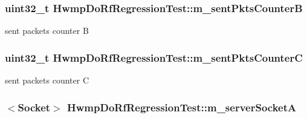 \subsubsection[{\texorpdfstring{m\+\_\+sent\+Pkts\+CounterB}{m_sentPktsCounterB}}]{\setlength{\rightskip}{0pt plus 5cm}uint32\+\_\+t Hwmp\+Do\+Rf\+Regression\+Test\+::m\+\_\+sent\+Pkts\+CounterB\hspace{0.3cm}{\ttfamily [private]}}\hypertarget{classHwmpDoRfRegressionTest_ade43bb8fd9548c572bac08b86fb842c7}{}\label{classHwmpDoRfRegressionTest_ade43bb8fd9548c572bac08b86fb842c7}


sent packets counter B 

\subsubsection[{\texorpdfstring{m\+\_\+sent\+Pkts\+CounterC}{m_sentPktsCounterC}}]{\setlength{\rightskip}{0pt plus 5cm}uint32\+\_\+t Hwmp\+Do\+Rf\+Regression\+Test\+::m\+\_\+sent\+Pkts\+CounterC\hspace{0.3cm}{\ttfamily [private]}}\hypertarget{classHwmpDoRfRegressionTest_a91d999821c87cc806f68d5e61ad04c43}{}\label{classHwmpDoRfRegressionTest_a91d999821c87cc806f68d5e61ad04c43}


sent packets counter C 

\subsubsection[{\texorpdfstring{m\+\_\+server\+SocketA}{m_serverSocketA}}]{$<${\bf Socket}$>$ Hwmp\+Do\+Rf\+Regression\+Test\+::m\+\_\+server\+SocketA\hspace{0.3cm}{\ttfamily [private]}}\hypertarget{classHwmpDoRfRegressionTest_a506012f31d13e62153b5de6b4160b894}{}\label{classHwmpDoRfRegressionTest_a506012f31d13e62153b5de6b4160b894}


